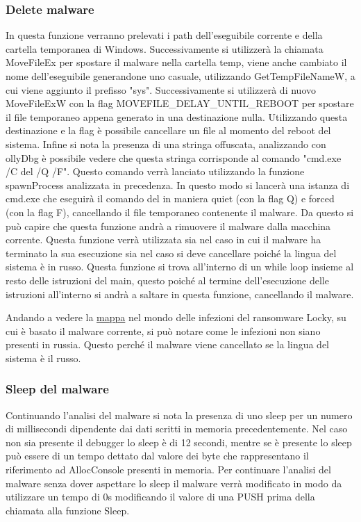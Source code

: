 \documentclass[]{article}
\begin{document}
\subsubsection{Delete malware}
In questa funzione verranno prelevati i path dell'eseguibile corrente e della cartella temporanea di Windows. Successivamente si utilizzerà la chiamata MoveFileEx per spostare il malware nella cartella temp, viene anche cambiato il nome dell'eseguibile generandone uno casuale, utilizzando GetTempFileNameW, a cui viene aggiunto il prefisso "sys".  Successivamente si utilizzerà di nuovo MoveFileExW con la flag MOVEFILE\_DELAY\_UNTIL\_REBOOT per spostare il file temporaneo appena generato in una destinazione nulla. Utilizzando questa destinazione e la flag è possibile cancellare un file al momento del reboot del sistema. 
Infine si nota la presenza di una stringa offuscata, analizzando con ollyDbg è possibile vedere che questa stringa corrisponde al comando "cmd.exe /C del /Q /F". Questo comando verrà lanciato utilizzando la funzione spawnProcess analizzata in precedenza. In questo modo si lancerà una istanza di cmd.exe che eseguirà il comando del in maniera quiet (con la flag Q) e forced (con la flag F), cancellando il file temporaneo contenente il malware. Da questo si può capire che questa funzione andrà a rimuovere il malware dalla macchina corrente. Questa funzione verrà utilizzata sia nel caso in cui il malware ha terminato la sua esecuzione sia nel caso si deve cancellare poiché la lingua del sistema è in russo.  Questa funzione si trova all'interno di un while loop insieme al resto delle istruzioni del main, questo poiché al termine dell'esecuzione delle istruzioni all'interno si andrà a saltare in questa funzione, cancellando il malware. 

Andando a vedere la \href{https://www.enterprisetimes.co.uk/2017/09/27/another-wave-locky-ransomware-arrives/}{mappa} nel mondo delle infezioni del ransomware Locky, su cui è basato il malware corrente, si può notare come le infezioni non siano presenti in russia. Questo perché il malware viene cancellato se la lingua del sistema è il russo.

\subsubsection{Sleep del malware}
Continuando l'analisi del malware si nota la presenza di uno sleep per un numero di millisecondi dipendente dai dati scritti in memoria precedentemente. Nel caso non sia presente il debugger lo sleep è di 12 secondi, mentre se è presente lo sleep può essere di un tempo dettato dal valore dei byte che rappresentano il riferimento ad AllocConsole presenti in memoria. 
Per continuare l'analisi del malware senza dover aspettare lo sleep il malware verrà modificato in modo da utilizzare un tempo di 0s modificando il valore di una PUSH prima della chiamata alla funzione Sleep. 
\end{document}
